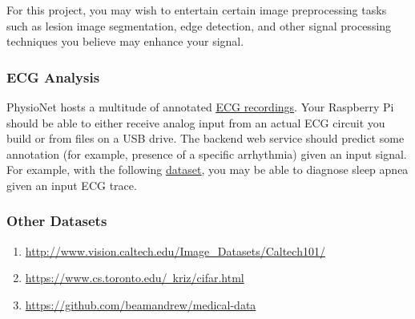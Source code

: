For this project, you may wish to entertain certain image preprocessing tasks such as lesion image segmentation, edge detection, and other signal processing techniques you believe may enhance your signal.

\subsubsection*{ECG Analysis}
PhysioNet hosts a multitude of annotated \underline{\href{https://physionet.org/physiobank/database/\#ecg}{ECG recordings}}. Your Raspberry Pi should be able to either receive analog input from an actual ECG circuit you build or from files on a USB drive. The backend web service should predict some annotation (for example, presence of a specific arrhythmia) given an input signal. For example, with the following \underline{\href{https://www.physionet.org/physiobank/database/apnea-ecg/}{dataset}}, you may be able to diagnose sleep apnea given an input ECG trace.

\subsubsection*{Other Datasets}
\begin{enumerate}
	\item \href{http://www.vision.caltech.edu/Image_Datasets/Caltech101/}{http://www.vision.caltech.edu/Image\_Datasets/Caltech101/}
	\item \href{https://www.cs.toronto.edu/~kriz/cifar.html}{https://www.cs.toronto.edu/~kriz/cifar.html}
	\item \href{https://github.com/beamandrew/medical-data}{https://github.com/beamandrew/medical-data}
\end{enumerate} 

